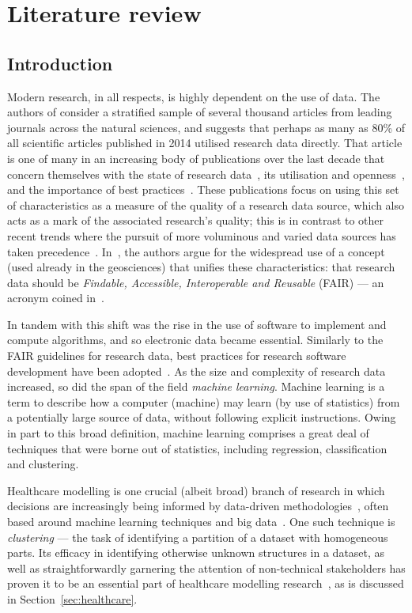 \chapter{Literature review}
\label{chp:lit}

\section{Introduction}

Modern research, in all respects, is highly dependent on the use of data. The
authors of \cite{Womack2015} consider a stratified sample of several thousand
articles from leading journals across the natural sciences, and suggests that
perhaps as many as 80\% of all scientific articles published in 2014 utilised
research data directly. That article is one of many in an increasing body of
publications over the last decade that concern themselves with the state of
research data~\cite{Higman2019}, its utilisation and
openness~\cite{Aslam2017,Zuiderwijk2020}, and the importance of best
practices~\cite{Colavizza2020,Corti2019}. These publications focus on using this
set of characteristics as a measure of the quality of a research data source,
which also acts as a mark of the associated research's quality; this is in
contrast to other recent trends where the pursuit of more voluminous and varied
data sources has taken precedence~\cite{Batistic2019}. In~\cite{Stall2019}, the
authors argue for the widespread use of a concept (used already in the
geosciences) that unifies these characteristics: that research data should be
\emph{Findable, Accessible, Interoperable and Reusable} (FAIR) --- an acronym
coined in~\cite{Wilkinson2016}.

In tandem with this shift was the rise in the use of software to implement and
compute algorithms, and so electronic data became essential. Similarly to the
FAIR guidelines for research data, best practices for research software
development have been adopted~\cite{Aberdour2007,Benureau2018,Jimenez2017}. As
the size and complexity of research data increased, so did the span of the field
\emph{machine learning}. Machine learning is a term to describe how a computer
(machine) may learn (by use of statistics) from a potentially large source of
data, without following explicit instructions. Owing in part to this broad
definition, machine learning comprises a great deal of techniques that were
borne out of statistics, including regression, classification and clustering.

Healthcare modelling is one crucial (albeit broad) branch of research in which
decisions are increasingly being informed by data-driven
methodologies~\cite{Belle2015,Katsaliaki2011,RiosZertuche2020}, often based
around machine learning techniques and big
data~\cite{Alexander2018,Archenaa2015}. One such technique is \emph{clustering}
--- the task of identifying a partition of a dataset with homogeneous parts. Its
efficacy in identifying otherwise unknown structures in a dataset, as well as
straightforwardly garnering the attention of non-technical stakeholders has
proven it to be an essential part of healthcare modelling
research~\cite{Tomar2013,Yoo2011}, as is discussed in
Section~\ref{sec:healthcare}.


